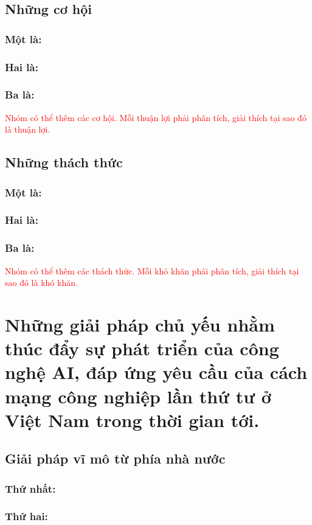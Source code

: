 \documentclass{report}
\begin{document}
\subsection{Những cơ hội}
\subsubsection{Một là:}
\subsubsection{Hai là:}
\subsubsection{Ba là:}
\textcolor{red}{Nhóm có thể thêm các cơ hội. Mỗi thuận lợi phải phân tích, giải thích tại sao đó là thuận lợi.}

\subsection{Những thách thức }
\subsubsection{Một là:}
\subsubsection{Hai là:}
\subsubsection{Ba là:}
\textcolor{red}{Nhóm có thể thêm các thách thức. Mỗi khó khăn phải phân tích, giải thích tại sao đó là khó khăn.}

\section{Những giải pháp chủ yếu nhằm thúc đẩy sự phát triển của công nghệ AI, đáp ứng yêu cầu của cách mạng công nghiệp lần thứ tư ở Việt Nam trong thời gian tới.}
\subsection{Giải pháp vĩ mô từ phía nhà nước}
\subsubsection{Thứ nhất:}
\subsubsection{Thứ hai:}
\end{document}
